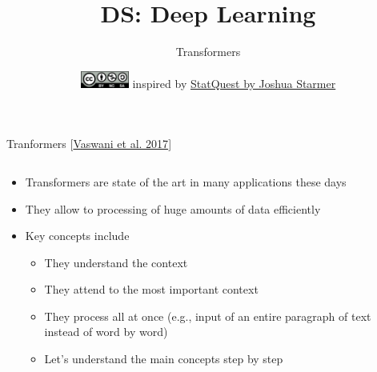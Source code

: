 \documentclass[aspectratio=169]{../latex_main/tntbeamer}  %
\title[DL: Transformers]{DS: Deep Learning}
\subtitle{Transformers}
\date{\hspace{0.5em} {\includegraphics[height=1.5em]{../latex_main/figures/Cc-by-nc-sa_icon.svg.png}} inspired by \href{https://www.youtube.com/watch?v=bQ5BoolX9Ag}{StatQuest by Joshua Starmer}}
\begin{document}
	
	\maketitle


        \begin{frame}{Tranformers [\href{https://arxiv.org/pdf/1706.03762}{Vaswani et al. 2017}]}

        \begin{columns}

        \begin{column}{0.5\textwidth}

            \begin{itemize}
                \item Transformers are state of the art in many applications these days
                \item They allow to processing of huge amounts of data efficiently
                \item Key concepts include
                \begin{itemize}
                    \item They understand the context
                    \item They attend to the most important context
                    \item They process all at once (e.g., input of an entire paragraph of text instead of word by word)
                    \item Let's understand the main concepts step by step
                \end{itemize}
            \end{itemize}

        \end{column}

        \begin{column}{0.5\textwidth}


\end{column}
\end{columns}
\end{frame}
\end{document}

